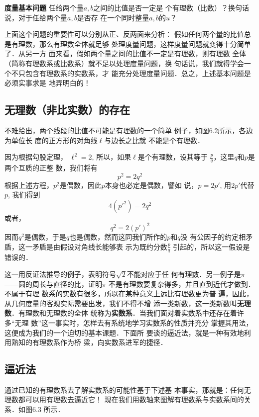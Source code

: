 \textbf{度量基本问题 } 任给两个量$a,b$之间的比值是否一定是
个有理数（比数）？换句话说，对于任给两个量$a,b$是否存
在一个同时整量$a,b$的$u$？

上面这个问题的重要性可以分别从正、反两面来分析：
假如任何两个量的比值总是有理数，那么有理数全体就足够
处理度量问题，这样度量问题就变得十分简单了．从另一方
面来看，假如两个量之间的比值不一定是有理数，则有理数
全体（简称有理数系或比数系）就不足以处理度量问题，换
句话说，我们就得学会一个不只包含有理数系的实数系，才
能充分处理度量问题．总之，上述基本问题是必须实事求是
地弄明白的！

\subsection{无理数（非比实数）的存在}
不难给出，两个线段的比值不可能是有理数的一个简单
例子，如图6.2所示，各边为单位长
度的正方形的对角线$\ell$与边长之比就
不能是个有理数．
\begin{figure}[htp]
    \centering
{}
    \caption{}
\end{figure}

因为根据勾股定理，
$\ell^2=2$, 所以，如果$\ell$是个有理数，设其等于
$\frac{p}{q}$，这里$q$和$p$是两个互质的正整
数，我们将有
\[p^2=2q^2\]
根据上述方程，$p^2$是偶数，因此$p$本身也必定是偶数，譬如
说，$p=2p'$, 用$2p'$代替$p$, 我们得到
\[4({p'}^2)=2q^2\]
或者，
\[q^2=2(p')^2\]
因而$q^2$是偶数，于是$q$也是偶数，然而这同我们所作的$p$和$q$没
有公因子的约定相矛盾，这一矛盾是由假设对角线长能够表
示为既约分数$\frac{p}{q}$
引起的，所以这一假设是错误的．

这一用反证法推导的例子，表明符号$\sqrt{2}$不能对应于任
何有理数．另一例子是$\pi$——圆的周长与直径的比，证明$\pi$
不是有理数要复杂得多，并且直到近代才做到．不属于有理
数系的实数有很多，所以在某种意义上远比有理数更为普
遍，因此，从几何度量的客观实际需要出发，我们不得不增
添一类新数，这一类新数叫\textbf{无理数}．有理数和无理数的全体
统称为\textbf{实数系}．当我们面对着实数系中还存在着许多“无理
数”这一事实时，怎样去有系统地学习实数系的性质并充分
掌握其用法，这便成为我们的一个迫切的基本课题．下面所
要谈的逼近法，就是一种有效地利用熟知的有理数系作为桥
梁，向实数系进军的捷径．

\subsection{逼近法}
通过已知的有理数系去了解实数系的可能性基于下述基
本事实，那就是：任何无理数都可以用有理数去逼近它！
现在我们用数轴来图解有理数系与实数系间的关系．如图6.3
所示．

